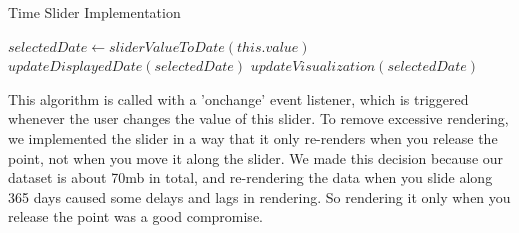 \documentclass[9pt,twocolumn,twoside]{opticajnl}
\begin{document}
\begin{algorithm}
    \caption{Time Slider Implementation}
    \begin{algorithmic}[1]
    \State $selectedDate \gets sliderValueToDate(this.value)$
    \State $updateDisplayedDate(selectedDate)$
    \State $updateVisualization(selectedDate)$
    \EndProcedure
    \end{algorithmic}
\end{algorithm}

This algorithm is called with a 'onchange' event listener, which is triggered whenever the user changes the value of this slider. To remove excessive rendering, we implemented the slider in a way that it only re-renders when you release the point, not when you move it along the slider. We made this decision because our dataset is about 70mb in total, and re-rendering the data when you slide along 365 days caused some delays and lags in rendering. So rendering it only when you release the point was a good compromise.
\end{document}
